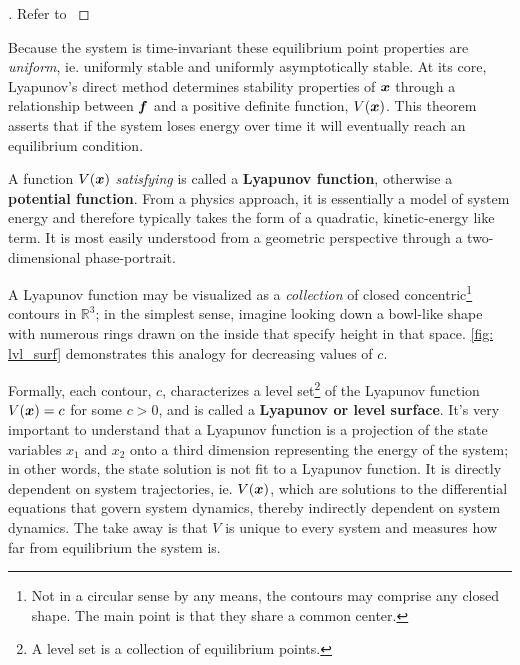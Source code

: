 \documentclass[12pt]{ucthesis}
\begin{document}
\begin{proof}[]
	Refer to \citet[Pg. 101]{Khalil1996}
\end{proof}

\begin{rem}
	Because the system is time-invariant these equilibrium point properties are \textit{uniform}, ie. uniformly stable and uniformly asymptotically stable. At its core, Lyapunov's direct method determines stability properties of $\boldsymbol{x}$ through a relationship between $\boldsymbol{f}$ and a positive definite function, $V(\boldsymbol{x})$. This theorem asserts that if the system loses energy over time it will eventually reach an equilibrium condition. 
\end{rem}

A function $V(\boldsymbol{x})$ \textit{satisfying } is called a \textbf{Lyapunov function}, otherwise a \textbf{potential function}. From a physics approach, it is essentially a model of system energy and therefore typically takes the form of a quadratic, kinetic-energy like term. It is most easily understood from a geometric perspective through a two-dimensional phase-portrait.

A Lyapunov function may be visualized as a \textit{collection} of closed concentric\footnote{Not in a circular sense by any means, the contours may comprise any closed shape. The main point is that they share a common center.} contours in $\mathbb{R}^3$; in the simplest sense, imagine looking down a bowl-like shape with numerous rings drawn on the inside that specify height in that space. \autoref{fig: lvl_surf} demonstrates this analogy for decreasing values of $c$.

Formally, each contour, $c$, characterizes a level set\footnote{A level set is a collection of equilibrium points.} of the Lyapunov function $V(\boldsymbol{x})=c$ for some $c>0$, and is called a \textbf{Lyapunov or level surface}. It's very important to understand that a Lyapunov function is a projection of the state variables $x_1$ and $x_2$ onto a third dimension representing the energy of the system; in other words, the state solution is not fit to a Lyapunov function. It is directly dependent on system trajectories, ie. $V(\boldsymbol{x})$, which are solutions to the differential equations that govern system dynamics, thereby indirectly dependent on system dynamics. The take away is that $V$ is unique to every system and measures how far from equilibrium the system is.
\end{document}
